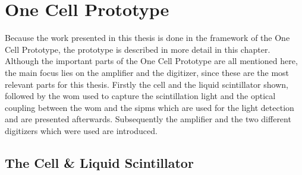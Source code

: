 \chapter{One Cell Prototype}

Because the work presented in this thesis is done in the framework of the One Cell Prototype, the prototype is described in more detail in this chapter.
Although the important parts of the One Cell Prototype are all mentioned here, the main focus lies on the amplifier and the digitizer, since these are the most relevant parts for this thesis.
Firstly the cell and the liquid scintillator shown, followed by the \ac{wom} used to capture the scintillation light and the optical coupling between the \ac{wom} and the \acp{sipm} which are used for the light detection and are presented afterwards.
Subsequently the amplifier and the two different digitizers which were used are introduced.



\section{The Cell \& Liquid Scintillator}

